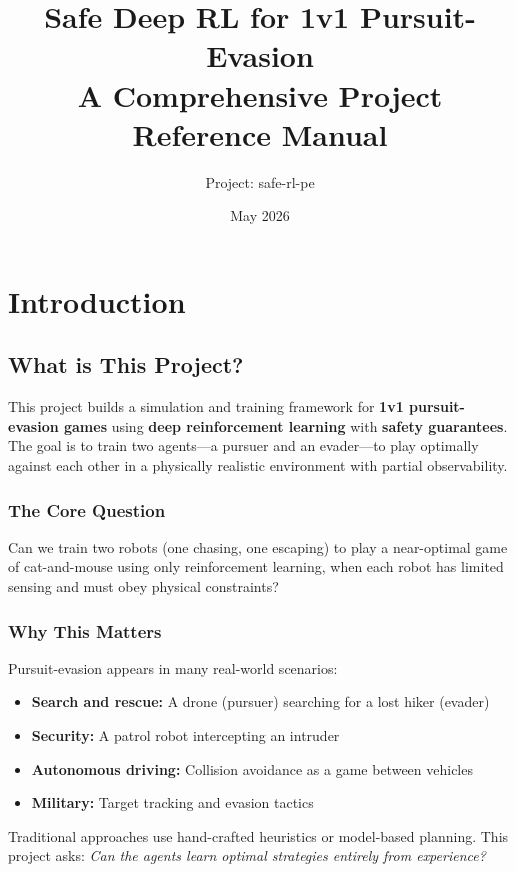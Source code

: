 \documentclass[11pt,a4paper]{report}
\title{\textbf{Safe Deep RL for 1v1 Pursuit-Evasion}\\
\large A Comprehensive Project Reference Manual}
\author{Project: safe-rl-pe}
\date{May 2026}
\begin{document}
\maketitle
\tableofcontents
\newpage

\chapter{Introduction}
\label{chap:intro}

\section{What is This Project?}

This project builds a simulation and training framework for \textbf{1v1 pursuit-evasion games} using \textbf{deep reinforcement learning} with \textbf{safety guarantees}. The goal is to train two agents---a pursuer and an evader---to play optimally against each other in a physically realistic environment with partial observability.

\subsection{The Core Question}

Can we train two robots (one chasing, one escaping) to play a near-optimal game of cat-and-mouse using only reinforcement learning, when each robot has limited sensing and must obey physical constraints?

\subsection{Why This Matters}

Pursuit-evasion appears in many real-world scenarios:
\begin{itemize}
    \item \textbf{Search and rescue:} A drone (pursuer) searching for a lost hiker (evader)
    \item \textbf{Security:} A patrol robot intercepting an intruder
    \item \textbf{Autonomous driving:} Collision avoidance as a game between vehicles
    \item \textbf{Military:} Target tracking and evasion tactics
\end{itemize}

Traditional approaches use hand-crafted heuristics or model-based planning. This project asks: \textit{Can the agents learn optimal strategies entirely from experience?}
\end{document}
